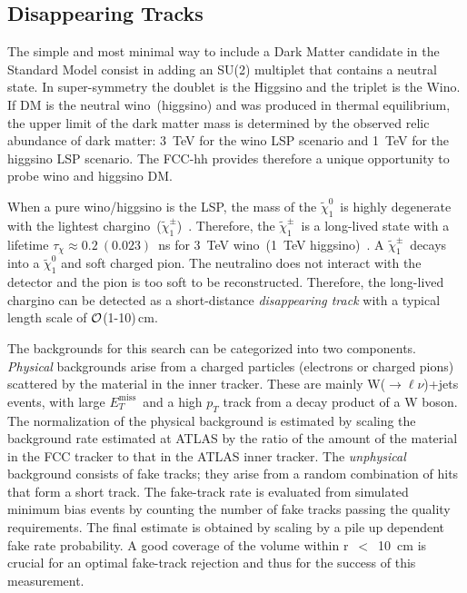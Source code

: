 \documentclass[11pt,twoside,a4paper]{cernrep}
\begin{document}
\subsection{Disappearing Tracks}
The simple and most minimal way to include a Dark Matter candidate in the Standard Model consist in adding an SU(2) multiplet that contains a neutral state. In super-symmetry the doublet is the Higgsino and the triplet is the Wino. If DM is the neutral wino~(higgsino) and was produced in thermal equilibrium, the upper limit of the dark matter mass is determined by the observed relic abundance of dark matter: 3~TeV for the wino LSP scenario and 1~TeV for the higgsino LSP scenario. The FCC-hh provides therefore a unique opportunity to probe wino and higgsino DM.

When a pure wino/higgsino is the LSP, the mass of the \ensuremath{\tilde{\chi}_{1}^{0}}~is highly degenerate with the lightest chargino~(\ensuremath{\tilde{\chi}_{1}^{\pm}})~\cite{Ibe:2012sx,Thomas:1998wy}.
Therefore, the \ensuremath{\tilde{\chi}_{1}^{\pm}}~is a long-lived state with a lifetime $\tau_{\chi}\approx 0.2~(0.023)$~ns for 3~TeV wino~(1~TeV higgsino)~\cite{Barr:2002ex}.
A \ensuremath{\tilde{\chi}_{1}^{\pm}}~decays into a \ensuremath{\tilde{\chi}_{1}^{0}} and soft charged pion. The neutralino does not interact with the detector and the pion is too soft to be reconstructed. Therefore, the long-lived chargino can be detected as a short-distance \emph{disappearing track} with a typical length scale of $\cal{O}$(1-10)\,cm.


The backgrounds for this search can be categorized into two components.
\emph{Physical} backgrounds arise from a charged particles (electrons or charged pions) scattered by the material in the inner tracker. These are mainly W($\rightarrow \ell\nu$)+jets events, with large $E_T^{\mathrm{miss}}$~and a high $p_{T}$ track from a decay product of a W boson. The normalization of the physical background is estimated by scaling the background rate estimated at ATLAS by the ratio of the amount of the material in the FCC tracker to that in the ATLAS inner tracker. The \emph{unphysical} background consists of fake tracks; they arise from a random combination of hits that form a short track. The fake-track rate is evaluated from simulated minimum bias events by counting the number of fake tracks passing the quality requirements. The final estimate is obtained by scaling by a pile up dependent fake rate probability. A good coverage of the volume within r~$<$~10~cm is crucial for an optimal fake-track rejection and thus for the success of this measurement.
\end{document}
